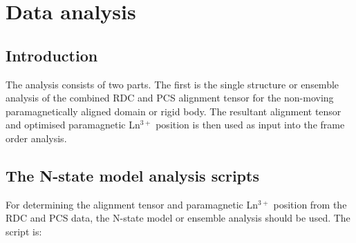 
\section{Data analysis}

\subsection{Introduction}

The analysis consists of two parts.
The first is the single structure or ensemble analysis of the combined RDC and PCS alignment tensor for the non-moving paramagnetically aligned domain or rigid body.
The resultant alignment tensor and optimised paramagnetic Ln$^{3+}$ position is then used as input into the frame order analysis.


\subsection{The N-state model analysis scripts}
\label{sect: N-state model analysis scripts}

For determining the alignment tensor and paramagnetic Ln$^{3+}$ position from the RDC and PCS data, the N-state model or ensemble analysis should be used.
The script is:


